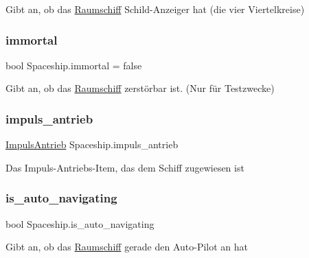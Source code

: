 Gibt an, ob das \hyperlink{class_raumschiff}{Raumschiff} Schild-\/\+Anzeiger hat (die vier Viertelkreise) 

\mbox{\label{class_spaceship_a6a17ebe141b503299caf808301bf60aa}} 
\subsubsection{\texorpdfstring{immortal}{immortal}}
{\footnotesize\ttfamily bool Spaceship.\+immortal = false}



Gibt an, ob das \hyperlink{class_raumschiff}{Raumschiff} zerstörbar ist. (Nur für Testzwecke) 

\mbox{\label{class_spaceship_a2f4055a6f9d52ba2ec599e86280f5325}} 
\subsubsection{\texorpdfstring{impuls\+\_\+antrieb}{impuls\_antrieb}}
{\footnotesize\ttfamily \hyperlink{class_impuls_antrieb}{Impuls\+Antrieb} Spaceship.\+impuls\+\_\+antrieb}



Das Impuls-\/\+Antriebs-\/\+Item, das dem Schiff zugewiesen ist 

\mbox{\label{class_spaceship_a6088ab385c31a4133eb7418bc79dd31b}} 
\subsubsection{\texorpdfstring{is\+\_\+auto\+\_\+navigating}{is\_auto\_navigating}}
{\footnotesize\ttfamily bool Spaceship.\+is\+\_\+auto\+\_\+navigating}



Gibt an, ob das \hyperlink{class_raumschiff}{Raumschiff} gerade den Auto-\/\+Pilot an hat 

\mbox{\label{class_spaceship_a012d6f0509e4e4c6afbeaa81b80c4b23}} 
